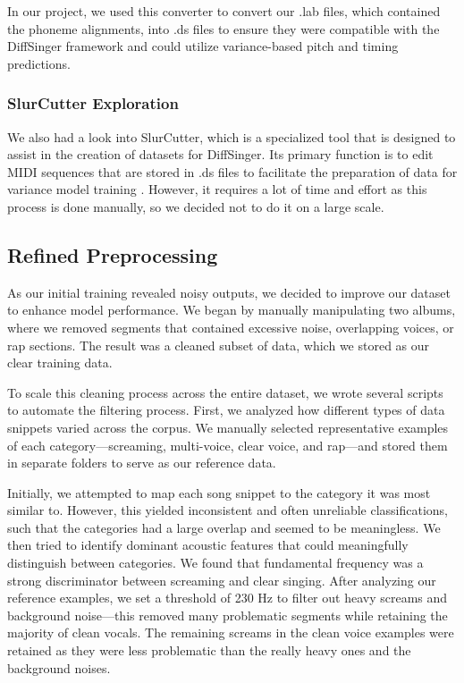 \documentclass[a4paper]{article}
\begin{document}
In our project, we used this converter to convert our .lab files, which contained the phoneme alignments, into .ds files to ensure they were compatible with the DiffSinger framework and could utilize variance-based pitch and timing predictions.

\subsubsection{SlurCutter Exploration}
We also had a look into SlurCutter, which is a specialized tool that is designed to assist in the creation of datasets for DiffSinger. Its primary function is to edit MIDI sequences that are stored in .ds files to facilitate the preparation of data for variance model training \cite{openvpi}. However, it requires a lot of time and effort as this process is done manually, so we decided not to do it on a large scale.



\subsection{Refined Preprocessing}
As our initial training revealed noisy outputs, we decided to improve our dataset to enhance model performance. We began by manually manipulating two albums, where we removed segments that contained excessive noise, overlapping voices, or rap sections. The result was a cleaned subset of data, which we stored as our clear training data.

To scale this cleaning process across the entire dataset, we wrote several scripts to automate the filtering process. First, we analyzed how different types of data snippets varied across the corpus. We manually selected representative examples of each category—screaming, multi-voice, clear voice, and rap—and stored them in separate folders to serve as our reference data.

Initially, we attempted to map each song snippet to the category it was most similar to. However, this yielded inconsistent and often unreliable classifications, such that the categories had a large overlap and seemed to be meaningless. We then tried to identify dominant acoustic features that could meaningfully distinguish between categories. We found that fundamental frequency was a strong discriminator between screaming and clear singing. After analyzing our reference examples, we set a threshold of 230 Hz to filter out heavy screams and background noise—this removed many problematic segments while retaining the majority of clean vocals. The remaining screams in the clean voice examples were retained as they were less problematic than the really heavy ones and the background noises.
\end{document}
